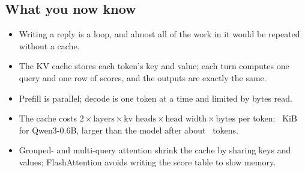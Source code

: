 \subsection*{What you now know}
\begin{itemize}
\item Writing a reply is a loop, and almost all of the work in it would be repeated without a cache.
\item The KV cache stores each token's key and value; each turn computes one query and one row of scores, and the
outputs are exactly the same.
\item Prefill is parallel; decode is one token at a time and limited by bytes read.
\item The cache costs $2\times\text{layers}\times\text{kv heads}\times\text{head width}\times\text{bytes}$
per token: \nNineQwenPerTokKiB\ KiB for Qwen3-0.6B, larger than the model after about \nNineQwenCross\ tokens.
\item Grouped- and multi-query attention shrink the cache by sharing keys and values; FlashAttention avoids
writing the score table to slow memory.
\end{itemize}
